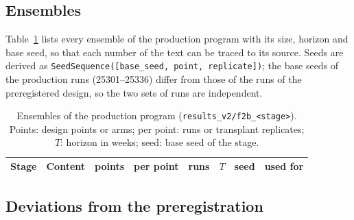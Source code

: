 \subsection{Ensembles}
\label{app:res-ensembles}

Table~\ref{tab:res-ensembles} lists every ensemble of the production program with its size, horizon and base seed, so
that each number of the text can be traced to its source. Seeds are derived as
\texttt{SeedSequence([base\_seed, point, replicate])}; the base seeds of the production runs (25301--25336) differ from those
of the runs of the preregistered design, so the two sets of runs are independent.

\begin{table}[ht]
  \centering
  \caption{Ensembles of the production program (\texttt{results\_v2/f2b\_<stage>}). Points: design points or arms;
  per point: runs or transplant replicates; $T$: horizon in weeks; seed: base seed of the stage.}
  \label{tab:res-ensembles}
  \scriptsize
  \setlength{\tabcolsep}{4pt}
  \begin{tabular}{@{}llrrrrrl@{}}
    \toprule
    Stage & Content & points & per point & runs & $T$ & seed & used for \\
    \midrule
    
  \end{tabular}
\end{table}

\subsection{Deviations from the preregistration}
\label{app:res-deviations}

